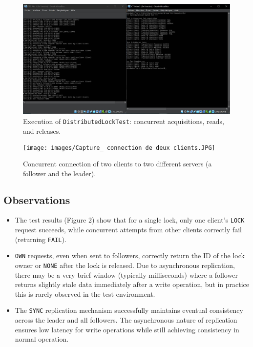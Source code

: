 \documentclass[a4paper,11pt]{article}
\begin{document}
\begin{figure}[H]
\centering
\includegraphics[width=0.9\linewidth]{images/Capture_distributed_lock_test.JPG}
\caption{Execution of \texttt{DistributedLockTest}: concurrent acquisitions, reads, and releases.}
\end{figure}

\begin{figure}[H]
\centering
\texttt{[image: images/Capture\_ connection de deux clients.JPG]}
\caption{Concurrent connection of two clients to two different servers (a follower and the leader).}
\end{figure}

\subsection*{Observations}
\begin{itemize}
    \item The test results (Figure 2) show that for a single lock, only one client's \texttt{LOCK} request succeeds, while concurrent attempts from other clients correctly fail (returning \texttt{FAIL}).
    \item \texttt{OWN} requests, even when sent to followers, correctly return the ID of the lock owner or \texttt{NONE} after the lock is released. Due to asynchronous replication, there may be a very brief window (typically milliseconds) where a follower returns slightly stale data immediately after a write operation, but in practice this is rarely observed in the test environment.
    \item The \texttt{SYNC} replication mechanism successfully maintains eventual consistency across the leader and all followers. The asynchronous nature of replication ensures low latency for write operations while still achieving consistency in normal operation.
\end{itemize}
\end{document}
